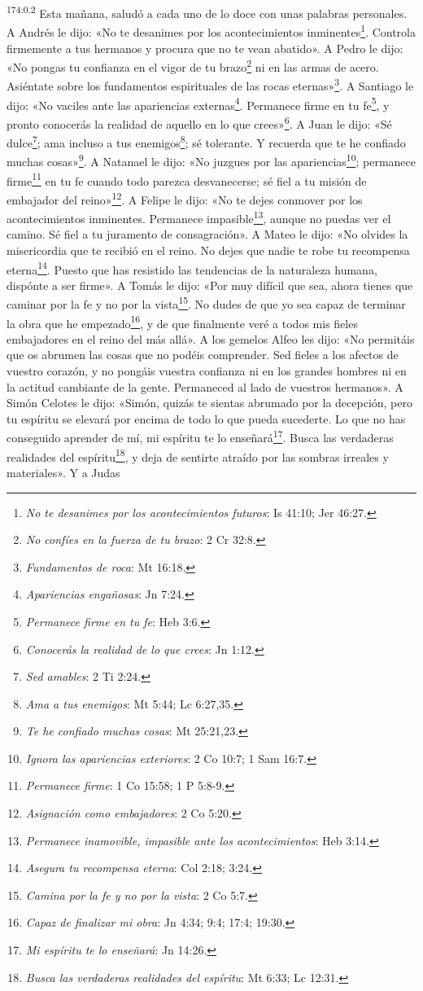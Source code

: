 \par
\textsuperscript{174:0.2} Esta mañana, saludó a cada uno de lo doce con unas palabras personales. A Andrés le dijo: «No te desanimes por los acontecimientos inminentes\footnote{\textit{No te desanimes por los acontecimientos futuros}: Is 41:10; Jer 46:27.}. Controla firmemente a tus hermanos y procura que no te vean abatido». A Pedro le dijo: «No pongas tu confianza en el vigor de tu brazo\footnote{\textit{No confíes en la fuerza de tu brazo}: 2 Cr 32:8.} ni en las armas de acero. Asiéntate sobre los fundamentos espirituales de las rocas eternas»\footnote{\textit{Fundamentos de roca}: Mt 16:18.}. A Santiago le dijo: «No vaciles ante las apariencias externas\footnote{\textit{Apariencias engañosas}: Jn 7:24.}. Permanece firme en tu fe\footnote{\textit{Permanece firme en tu fe}: Heb 3:6.}, y pronto conocerás la realidad de aquello en lo que crees»\footnote{\textit{Conocerás la realidad de lo que crees}: Jn 1:12.}. A Juan le dijo: «Sé dulce\footnote{\textit{Sed amables}: 2 Ti 2:24.}; ama incluso a tus enemigos\footnote{\textit{Ama a tus enemigos}: Mt 5:44; Lc 6:27,35.}; sé tolerante. Y recuerda que te he confiado muchas cosas»\footnote{\textit{Te he confiado muchas cosas}: Mt 25:21,23.}. A Natanael le dijo: «No juzgues por las apariencias\footnote{\textit{Ignora las apariencias exteriores}: 2 Co 10:7; 1 Sam 16:7.}; permanece firme\footnote{\textit{Permanece firme}: 1 Co 15:58; 1 P 5:8-9.} en tu fe cuando todo parezca desvanecerse; sé fiel a tu misión de embajador del reino»\footnote{\textit{Asignación como embajadores}: 2 Co 5:20.}. A Felipe le dijo: «No te dejes conmover por los acontecimientos inminentes. Permanece impasible\footnote{\textit{Permanece inamovible, impasible ante los acontecimientos}: Heb 3:14.}, aunque no puedas ver el camino. Sé fiel a tu juramento de consagración». A Mateo le dijo: «No olvides la misericordia que te recibió en el reino. No dejes que nadie te robe tu recompensa eterna\footnote{\textit{Asegura tu recompensa eterna}: Col 2:18; 3:24.}. Puesto que has resistido las tendencias de la naturaleza humana, dispónte a ser firme». A Tomás le dijo: «Por muy difícil que sea, ahora tienes que caminar por la fe y no por la vista\footnote{\textit{Camina por la fe y no por la vista}: 2 Co 5:7.}. No dudes de que yo sea capaz de terminar la obra que he empezado\footnote{\textit{Capaz de finalizar mi obra}: Jn 4:34; 9:4; 17:4; 19:30.}, y de que finalmente veré a todos mis fieles embajadores en el reino del más allá». A los gemelos Alfeo les dijo: «No permitáis que os abrumen las cosas que no podéis comprender. Sed fieles a los afectos de vuestro corazón, y no pongáis vuestra confianza ni en los grandes hombres ni en la actitud cambiante de la gente. Permaneced al lado de vuestros hermanos». A Simón Celotes le dijo: «Simón, quizás te sientas abrumado por la decepción, pero tu espíritu se elevará por encima de todo lo que pueda sucederte. Lo que no has conseguido aprender de mí, mi espíritu te lo enseñará\footnote{\textit{Mi espíritu te lo enseñará}: Jn 14:26.}. Busca las verdaderas realidades del espíritu\footnote{\textit{Busca las verdaderas realidades del espíritu}: Mt 6:33; Lc 12:31.}, y deja de sentirte atraído por las sombras irreales y materiales». Y a Judas 